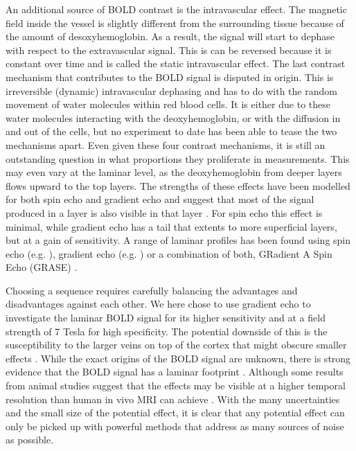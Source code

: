 An additional source of BOLD contrast is the intravascular effect. The magnetic field inside the vessel is slightly different from the surrounding tissue because of the amount of desoxyhemoglobin. As a result, the signal will start to dephase with respect to the extravascular signal. This is can be reversed because it is constant over time and is called the static intravascular effect. The last contrast mechanism that contributes to the BOLD signal is disputed in origin. This is irreversible (dynamic) intravascular dephasing and has to do with the random movement of water molecules within red blood cells. It is either due to these water molecules interacting with the deoxyhemoglobin, or with the diffusion in and out of the cells, but no experiment to date has been able to tease the two mechanisms apart.
Even given these four contrast mechanisms, it is still an outstanding question in what proportions they proliferate in measurements. This may even vary at the laminar level, as the deoxyhemoglobin from deeper layers flows upward to the top layers. The strengths of these effects have been modelled for both spin echo and gradient echo and suggest that most of the signal produced in a layer is also visible in that layer \cite{Markuerkiaga2016,Uludag2017}. For spin echo this effect is minimal, while gradient echo has a tail that extents to more superficial layers, but at a gain of sensitivity. A range of laminar profiles has been found using spin echo (e.g. \cite{Zhao2004,Harel2006,Goense2006}), gradient echo (e.g. \cite{Polimeni2010,DeMartino2013,Chen2013}) or a combination of both, GRadient A Spin Echo (GRASE) \cite{Olman2012,DeMartino2013}.

Choosing a sequence requires carefully balancing the advantages and disadvantages against each other. We here chose to use gradient echo to investigate the laminar BOLD signal for its higher sensitivity and at a field strength of 7 Tesla for high specificity. The potential downside of this is the susceptibility to the larger veins on top of the cortex that might obscure smaller effects \cite{Barth2007}. While the exact origins of the BOLD signal are unknown, there is strong evidence that the BOLD signal has a laminar footprint \cite{Logothetis2001}. Although some results from animal studies suggest that the effects may be visible at a higher temporal resolution than human in vivo MRI can achieve \cite{Yu2014,OHerron2016}. With the many uncertainties and the small size of the potential effect, it is clear that any potential effect can only be picked up with powerful methods that address as many sources of noise as possible. 

